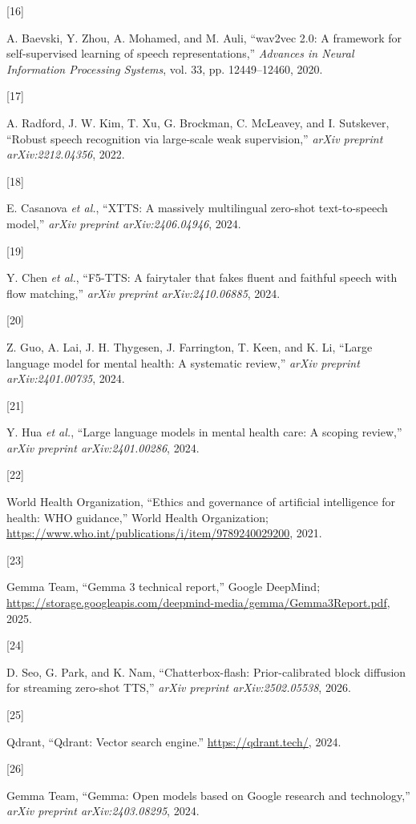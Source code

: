 \documentclass[
  letterpaper,
  12pt,
  a4paper,
  openany]{report}
\newlength{\cslhangindent}
\newlength{\csllabelwidth}
\newenvironment{CSLReferences}[2] %
 {\begin{list}{}{%
  \setlength{\itemindent}{0pt}
  \setlength{\leftmargin}{0pt}
  \setlength{\parsep}{0pt}
  \ifodd #1
   \setlength{\leftmargin}{\cslhangindent}
   \setlength{\itemindent}{-1\cslhangindent}
  \fi
  \setlength{\itemsep}{#2\baselineskip}}}
 {\end{list}}
\newcommand{\CSLLeftMargin}[1]{\parbox[t]{\csllabelwidth}{\strut#1\strut}}
\newcommand{\CSLRightInline}[1]{\parbox[t]{\linewidth - \csllabelwidth}{\strut#1\strut}}
\begin{document}
\begin{CSLReferences}{0}{0}
\CSLLeftMargin{{[}16{]} }%
\CSLRightInline{A. Baevski, Y. Zhou, A. Mohamed, and M. Auli, {``wav2vec
2.0: A framework for self-supervised learning of speech
representations,''} \emph{Advances in Neural Information Processing
Systems}, vol. 33, pp. 12449--12460, 2020.}

\CSLLeftMargin{{[}17{]} }%
\CSLRightInline{A. Radford, J. W. Kim, T. Xu, G. Brockman, C. McLeavey,
and I. Sutskever, {``Robust speech recognition via large-scale weak
supervision,''} \emph{arXiv preprint arXiv:2212.04356}, 2022.}

\CSLLeftMargin{{[}18{]} }%
\CSLRightInline{{E. Casanova \emph{et al.}}, {``{XTTS}: A massively
multilingual zero-shot text-to-speech model,''} \emph{arXiv preprint
arXiv:2406.04946}, 2024.}

\CSLLeftMargin{{[}19{]} }%
\CSLRightInline{{Y. Chen \emph{et al.}}, {``{F5-TTS}: A fairytaler that
fakes fluent and faithful speech with flow matching,''} \emph{arXiv
preprint arXiv:2410.06885}, 2024.}

\CSLLeftMargin{{[}20{]} }%
\CSLRightInline{Z. Guo, A. Lai, J. H. Thygesen, J. Farrington, T. Keen,
and K. Li, {``Large language model for mental health: A systematic
review,''} \emph{arXiv preprint arXiv:2401.00735}, 2024.}

\CSLLeftMargin{{[}21{]} }%
\CSLRightInline{Y. Hua \emph{et al.}, {``Large language models in mental
health care: A scoping review,''} \emph{arXiv preprint
arXiv:2401.00286}, 2024.}

\CSLLeftMargin{{[}22{]} }%
\CSLRightInline{World Health Organization, {``Ethics and governance of
artificial intelligence for health: {WHO} guidance,''} {World Health
Organization};
\url{https://www.who.int/publications/i/item/9789240029200}, 2021.}

\CSLLeftMargin{{[}23{]} }%
\CSLRightInline{Gemma Team, {``{Gemma 3} technical report,''} {Google
DeepMind};
\url{https://storage.googleapis.com/deepmind-media/gemma/Gemma3Report.pdf},
2025.}

\CSLLeftMargin{{[}24{]} }%
\CSLRightInline{D. Seo, G. Park, and K. Nam, {``Chatterbox-flash:
Prior-calibrated block diffusion for streaming zero-shot {TTS},''}
\emph{arXiv preprint arXiv:2502.05538}, 2026.}

\CSLLeftMargin{{[}25{]} }%
\CSLRightInline{Qdrant, {``{Qdrant}: Vector search engine.''}
\url{https://qdrant.tech/}, 2024.}

\CSLLeftMargin{{[}26{]} }%
\CSLRightInline{Gemma Team, {``Gemma: Open models based on {Google}
research and technology,''} \emph{arXiv preprint arXiv:2403.08295},
2024.}

\end{CSLReferences}
\end{document}

